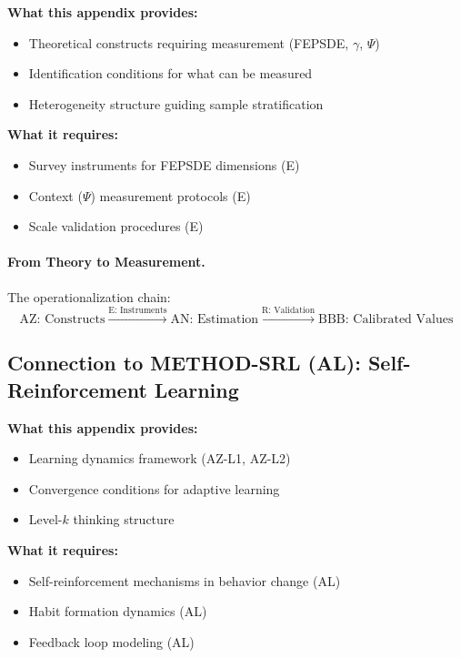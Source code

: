 \begin{tcolorbox}[colback=yellow!5!white, colframe=yellow!75!black,
    title=Integration: METHOD-CONSTRUCT $\leftrightarrow$ METHOD-OPS (E)]
\textbf{What this appendix provides:}
\begin{itemize}[nosep]
\item Theoretical constructs requiring measurement (FEPSDE, $\gamma$, $\Psi$)
\item Identification conditions for what can be measured
\item Heterogeneity structure guiding sample stratification
\end{itemize}

\textbf{What it requires:}
\begin{itemize}[nosep]
\item Survey instruments for FEPSDE dimensions (E)
\item Context ($\Psi$) measurement protocols (E)
\item Scale validation procedures (E)
\end{itemize}
\end{tcolorbox}

\paragraph{From Theory to Measurement.}
The operationalization chain:
\begin{equation}
\text{AZ: Constructs} \xrightarrow{\text{E: Instruments}} \text{AN: Estimation} \xrightarrow{\text{R: Validation}} \text{BBB: Calibrated Values}
\end{equation}

\subsection{Connection to METHOD-SRL (AL): Self-Reinforcement Learning}

\begin{tcolorbox}[colback=yellow!5!white, colframe=yellow!75!black,
    title=Integration: METHOD-CONSTRUCT $\leftrightarrow$ METHOD-SRL (AL)]
\textbf{What this appendix provides:}
\begin{itemize}[nosep]
\item Learning dynamics framework (AZ-L1, AZ-L2)
\item Convergence conditions for adaptive learning
\item Level-$k$ thinking structure
\end{itemize}

\textbf{What it requires:}
\begin{itemize}[nosep]
\item Self-reinforcement mechanisms in behavior change (AL)
\item Habit formation dynamics (AL)
\item Feedback loop modeling (AL)
\end{itemize}
\end{tcolorbox}

